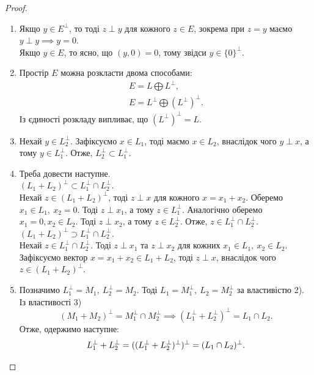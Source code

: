 \documentclass{math_library}
\begin{document}
\begin{proof}
\begin{enumerate}[topsep=0pt, wide=0pt, label={\arabic*)}]
\item Якщо $y \in E^{\perp}$, то тоді $z \perp y$ для кожного $z \in E$, зокрема при $z = y$ маємо $y \perp y \implies y = 0$.\\
Якщо $y \in E$, то ясно, що $(y,0) = 0$, тому звідси $y \in \{0\}^\perp$. 

\item Простір $E$ можна розкласти двома способами:
\begin{align*}
E = L \bigoplus L^{\perp}, \\
E = L^{\perp} \bigoplus (L^{\perp})^{\perp}.
\end{align*}
Із єдиності розкладу випливає, що $(L^{\perp})^{\perp} = L$.

\item Нехай $y \in L_2^{\perp}$. Зафіксуємо $x \in L_1$, тоді маємо $x \in L_2$, внаслідок чого $y \perp x$, а тому $y \in L_1^{\perp}$. Отже, $L_2^{\perp} \subset L_1^{\perp}$.

\item Треба довести наступне.\\
\textit{$(L_1+L_2)^\perp \subset L_1^\perp \cap L_2^{\perp}$}.\\
Нехай $z \in (L_1+L_2)^\perp$, тоді $z \perp x$ для кожного $x = x_1 + x_2$. Оберемо $x_1 \in L_1,\ x_2 = 0$. Тоді $z \perp x_1$, а тому $z \in L_1^\perp$. Аналогічно оберемо $x_1 = 0, x_2 \in L_2$. Тоді $z \perp x_2$, а тому $z \in L_2^\perp$. Отже, $z \in L_1^\perp \cap L_2^\perp$.
\bigskip \\
\textit{$(L_1+L_2)^\perp \supset L_1^\perp \cap L_2^\perp$.}\\
Нехай $z \in L_1^\perp \cap L_2^\perp$. Тоді $z \perp x_1$ та $z \perp x_2$ для кожних $x_1 \in L_1,\ x_2 \in L_2$. Зафіксуємо вектор $x = x_1+x_2 \in L_1+L_2$, тоді $z \perp x$, внаслідок чого $z \in (L_1+L_2)^\perp$.
\iffalse
3) $\forall z \in (L_1+L_2)^{\perp}: \forall x \in L_1, y \in L_2: x+y \in L_1+L_2: (z,x+y) = 0$\\
Тому $(z,x+y) = 0 \iff \begin{cases} (z,x) = 0 \\ (z,y) = 0 \end{cases} \iff \begin{cases} z \in L_1^{\perp} \\ z \in L_2^{\perp} \end{cases} \iff z \in L_1^{\perp} \cap L_2^{\perp}$
\fi
\item Позначимо $L_1^{\perp} = M_1,\ L_2^{\perp} = M_2$. Тоді $L_1 = M_1^{\perp},\ L_2 = M_2^{\perp}$ за властивістю 2). Із властивості 3)
\[
(M_1+M_2)^{\perp} = M_1^{\perp} \cap M_2^{\perp} \implies (L_1^{\perp} + L_2^{\perp})^{\perp} = L_1 \cap L_2.
\]
Отже, одержимо наступне:
\[
L_1^{\perp} + L_2^{\perp}=((L_1^{\perp} + L_2^{\perp})^{\perp})^{\perp} = (L_1 \cap L_2)^{\perp}. \qedhere
\]
\end{enumerate}
\end{proof}
\noindent
\end{document}
